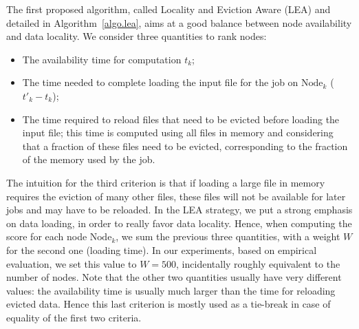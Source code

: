 \documentclass[sigconf,review,anonymous]{acmart}
\newcommand{\Node}[1]{\ensuremath{\mathrm{Node}_{#1}}\xspace}
\begin{document}
The first proposed algorithm, called Locality and Eviction Aware (LEA)
and detailed in Algorithm~\ref{algo.lea}, aims at a good balance
between node availability and data locality.  We consider three
quantities to rank nodes:
\begin{itemize}
\item The availability time for computation $t_k$;
\item The time needed to complete loading the input file for the job
  on \Node{k} ($t'_k - t_k$);
\item The time required to reload files that need to be evicted before
  loading the input file; this time is computed using all files in
  memory and considering that a fraction of these files need to be
  evicted, corresponding to the fraction of the memory used by the job.
\end{itemize}

The intuition for the third criterion is that if loading a large file
in memory requires the eviction of many other files, these files will not
be available for later jobs and may have to be reloaded.
In the LEA strategy, we put a strong emphasis on data loading, in order
to really favor data locality. Hence, when computing the score for
each node \Node{k}, we sum the previous three quantities, with a weight
$W$ for the second one (loading time). In our experiments, based on
empirical evaluation, we set this value to $W=500$, incidentally roughly
equivalent to the number of nodes.
Note that the other two quantities usually have very different values:
the availability time is usually much larger than the time for
reloading evicted data. Hence this last criterion is mostly used as a
tie-break in case of equality of the first two criteria.
\end{document}
